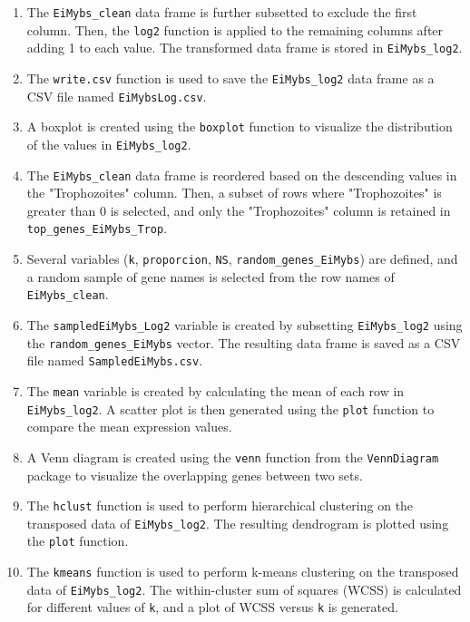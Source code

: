 \documentclass{article}
\begin{document}
\begin{enumerate}
\item The \texttt{EiMybs\_clean} data frame is further subsetted to exclude the first column. Then, the \texttt{log2} function is applied to the remaining columns after adding 1 to each value. The transformed data frame is stored in \texttt{EiMybs\_log2}.

\item The \texttt{write.csv} function is used to save the \texttt{EiMybs\_log2} data frame as a CSV file named \texttt{EiMybsLog.csv}.

\item A boxplot is created using the \texttt{boxplot} function to visualize the distribution of the values in \texttt{EiMybs\_log2}.

\item The \texttt{EiMybs\_clean} data frame is reordered based on the descending values in the "Trophozoites" column. Then, a subset of rows where "Trophozoites" is greater than 0 is selected, and only the "Trophozoites" column is retained in \texttt{top\_genes\_EiMybs\_Trop}.

\item Several variables (\texttt{k}, \texttt{proporcion}, \texttt{NS}, \texttt{random\_genes\_EiMybs}) are defined, and a random sample of gene names is selected from the row names of \texttt{EiMybs\_clean}.

\item The \texttt{sampledEiMybs\_Log2} variable is created by subsetting \texttt{EiMybs\_log2} using the \texttt{random\_genes\_EiMybs} vector. The resulting data frame is saved as a CSV file named \texttt{SampledEiMybs.csv}.

\item The \texttt{mean} variable is created by calculating the mean of each row in \texttt{EiMybs\_log2}. A scatter plot is then generated using the \texttt{plot} function to compare the mean expression values.

\item A Venn diagram is created using the \texttt{venn} function from the \texttt{VennDiagram} package to visualize the overlapping genes between two sets.

\item The \texttt{hclust} function is used to perform hierarchical clustering on the transposed data of \texttt{EiMybs\_log2}. The resulting dendrogram is plotted using the \texttt{plot} function.

\item The \texttt{kmeans} function is used to perform k-means clustering on the transposed data of \texttt{EiMybs\_log2}. The within-cluster sum of squares (WCSS) is calculated for different values of \texttt{k}, and a plot of WCSS versus \texttt{k} is generated.


\end{enumerate}
\end{document}
